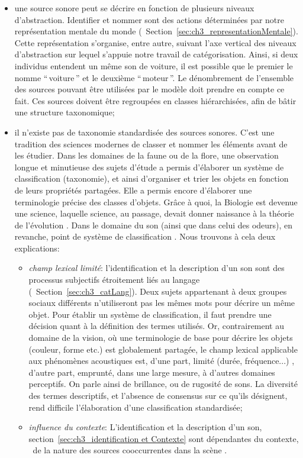 \begin{itemize}
\item une source sonore peut se décrire en fonction de plusieurs niveaux d'abstraction. Identifier et nommer sont des actions déterminées par notre représentation mentale du monde (\cf~Section~\ref{sec:ch3_representationMentale}). Cette représentation s'organise, entre autre, suivant l'axe vertical des niveaux d'abstraction sur lequel s'appuie notre travail de catégorisation. Ainsi, si deux individus entendent un même son de voiture, il est possible que le premier le nomme ``\,voiture\,'' et le deuxième ``\,moteur\,''. Le dénombrement de l'ensemble des sources pouvant être utilisées par le modèle doit prendre en compte ce fait. Ces sources doivent être regroupées en classes hiérarchisées, afin de bâtir une structure taxonomique;
\item il n'existe pas de taxonomie standardisée des sources sonores. C'est une tradition des sciences modernes de classer et nommer les éléments avant de les étudier. Dans les domaines de la faune ou de la flore, une observation longue et minutieuse des sujets d'étude a permis d'élaborer un système de classification (taxonomie), et ainsi d'organiser et trier les objets en fonction de leurs propriétés partagées. Elle a permis encore d'élaborer une terminologie précise des classes d'objets. Grâce à quoi, la Biologie est devenue une science, laquelle science, au passage, devait donner naissance à la théorie de l'évolution \citep{lecointre2006tree}. Dans le domaine du son (ainsi que dans celui des odeurs), en revanche, point de système de classification \citep{dubois2000categories,niessen2010categories}. Nous trouvons à cela deux explications:

\begin{itemize}
\item \emph{champ lexical limité}: l'identification et la description d'un son sont des processus subjectifs étroitement liés au langage (\cf~Section~\ref{sec:ch3_catLang}). Deux sujets appartenant à deux groupes sociaux différents n'utiliseront pas les mêmes mots pour décrire un même objet. Pour établir un système de classification, il faut prendre une décision quant à la définition des termes utilisés. Or, contrairement au domaine de la vision, où une terminologie de base pour décrire les objets (couleur, forme etc.) est globalement partagée, le champ lexical applicable aux phénomènes acoustiques est, d'une part, limité (durée, fréquence...) \citep{dubois2000categories}, d'autre part, emprunté, dans une large mesure, à d'autres domaines perceptifs. On parle ainsi de brillance, ou de rugosité de sons. La diversité des termes descriptifs, et l'absence de consensus sur ce qu'ils désignent, rend difficile l'élaboration d'une classification standardisée;
\item \emph{influence du contexte}: L'identification et la description d'un son, section~\ref{sec:ch3_identification et Contexte} sont dépendantes du contexte, \ie~de la nature des sources cooccurrentes dans la scène \citep{ballas1987interpreting,niessen2008disambiguating,gygi2011incongruency}.
\end{itemize}
\end{itemize}

